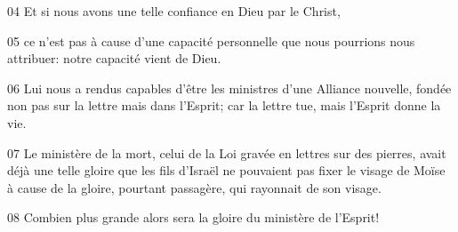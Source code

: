 
04 Et si nous avons une telle confiance en Dieu par le Christ,

05 ce n’est pas à cause d’une capacité personnelle que nous pourrions nous attribuer: notre capacité vient de Dieu.

06 Lui nous a rendus capables d’être les ministres d’une Alliance nouvelle, fondée non pas sur la lettre mais dans l’Esprit; car la lettre tue, mais l’Esprit donne la vie.

07 Le ministère de la mort, celui de la Loi gravée en lettres sur des pierres, avait déjà une telle gloire que les fils d’Israël ne pouvaient pas fixer le visage de Moïse à cause de la gloire, pourtant passagère, qui rayonnait de son visage.

08 Combien plus grande alors sera la gloire du ministère de l’Esprit!

